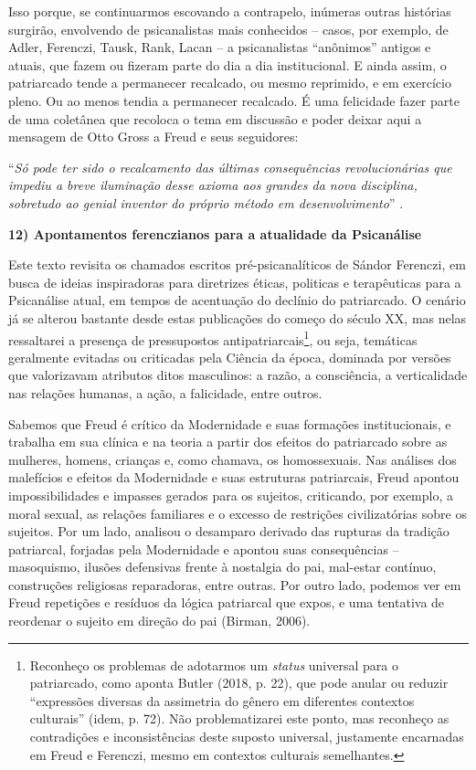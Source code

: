 Isso porque, se continuarmos escovando a contrapelo, inúmeras outras
histórias surgirão, envolvendo de psicanalistas mais conhecidos --
casos, por exemplo, de Adler, Ferenczi, Tausk, Rank, Lacan -- a
psicanalistas ``anônimos'' antigos e atuais, que fazem ou fizeram parte
do dia a dia institucional. E ainda assim, o patriarcado tende a
permanecer recalcado, ou mesmo reprimido, e em exercício pleno. Ou ao
menos tendia a permanecer recalcado. É uma felicidade fazer parte de uma
coletânea que recoloca o tema em discussão e poder deixar aqui a
mensagem de Otto Gross a Freud e seus seguidores:

``\emph{Só pode ter sido o recalcamento das últimas consequências
revolucionárias que impediu a breve iluminação desse axioma aos grandes
da nova disciplina, sobretudo ao genial inventor do próprio método em
desenvolvimento}'' .

\textbf{12) Apontamentos ferenczianos para a atualidade da Psicanálise}

Este texto revisita os chamados escritos pré-psicanalíticos de Sándor
Ferenczi, em busca de ideias inspiradoras para diretrizes éticas,
politicas e terapêuticas para a Psicanálise atual, em tempos de
acentuação do declínio do patriarcado. O cenário já se alterou bastante
desde estas publicações do começo do século XX, mas nelas ressaltarei a
presença de pressupostos antipatriarcais\footnote{Reconheço os problemas
  de adotarmos um \emph{status} universal para o patriarcado, como
  aponta Butler (2018, p. 22), que pode anular ou reduzir ``expressões
  diversas da assimetria do gênero em diferentes contextos culturais''
  (idem, p. 72). Não problematizarei este ponto, mas reconheço as
  contradições e inconsistências deste suposto universal, justamente
  encarnadas em Freud e Ferenczi, mesmo em contextos culturais
  semelhantes.}, ou seja, temáticas geralmente evitadas ou criticadas
pela Ciência da época, dominada por versões que valorizavam atributos
ditos masculinos: a razão, a consciência, a verticalidade nas relações
humanas, a ação, a falicidade, entre outros.

Sabemos que Freud é crítico da Modernidade e suas formações
institucionais, e trabalha em sua clínica e na teoria a partir dos
efeitos do patriarcado sobre as mulheres, homens, crianças e, como
chamava, os homossexuais. Nas análises dos malefícios e efeitos da
Modernidade e suas estruturas patriarcais, Freud apontou
impossibilidades e impasses gerados para os sujeitos, criticando, por
exemplo, a moral sexual, as relações familiares e o excesso de
restrições civilizatórias sobre os sujeitos. Por um lado, analisou o
desamparo derivado das rupturas da tradição patriarcal, forjadas pela
Modernidade e apontou suas consequências -- masoquismo, ilusões
defensivas frente à nostalgia do pai, mal-estar contínuo, construções
religiosas reparadoras, entre outras. Por outro lado, podemos ver em
Freud repetições e resíduos da lógica patriarcal que expos, e uma
tentativa de reordenar o sujeito em direção do pai (Birman, 2006).

